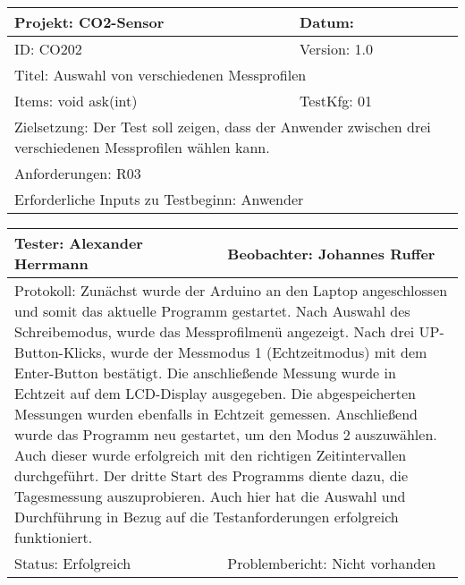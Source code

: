 \begin{table}[!hbt]
	
	\centering
	
	\begin{tabular}{|p{5cm}|p{5cm}|}
		
		\hline
		Projekt: CO2-Sensor & Datum: \\
		\hline
		ID: CO202 & Version: 1.0 \\
		\hline
		\multicolumn{2}{|l|}{Titel: Auswahl von verschiedenen Messprofilen} \\
		\hline
		Items: void ask(int) & TestKfg: 01 \\
		\hline
		\multicolumn{2}{|p{\textwidth-2\tabcolsep}|}{Zielsetzung: Der Test soll zeigen, dass der Anwender zwischen drei verschiedenen Messprofilen wählen kann.} \\
		\hline
		\multicolumn{2}{|l|}{Anforderungen: R03} \\
		\hline
		\multicolumn{2}{|l|}{Erforderliche Inputs zu Testbeginn: Anwender} \\
		\hline
		
	\end{tabular}
	
	\label{tab:Test_2}
	
\end{table}

\begin{table}[!hbt]
	
	\centering
	
	\begin{tabular}{|p{8cm}|p{8cm}|}
		
		\hline
		Tester: Alexander Herrmann & Beobachter: Johannes Ruffer \\
		\hline
		\multicolumn{2}{|p{\textwidth-2\tabcolsep}|}{Protokoll: \newline Zunächst wurde der Arduino an den Laptop angeschlossen und somit das aktuelle Programm gestartet. Nach Auswahl des Schreibemodus, wurde das Messprofilmenü angezeigt. Nach drei UP-Button-Klicks, wurde der Messmodus 1 (Echtzeitmodus) mit dem Enter-Button bestätigt. \newline Die anschließende Messung wurde in Echtzeit auf dem \ac{LCD}-Display ausgegeben. Die abgespeicherten Messungen wurden ebenfalls in Echtzeit gemessen. Anschließend wurde das Programm neu gestartet, um den Modus 2 auszuwählen. Auch dieser wurde erfolgreich mit den richtigen Zeitintervallen durchgeführt. \newline Der dritte Start des Programms diente dazu, die Tagesmessung auszuprobieren. Auch hier hat die Auswahl und Durchführung in Bezug auf die Testanforderungen erfolgreich funktioniert.} \\
		\hline
		Status: Erfolgreich & Problembericht: Nicht vorhanden \\
		\hline
		
	\end{tabular}
	
	\label{tab:Tester2}
	
\end{table}
